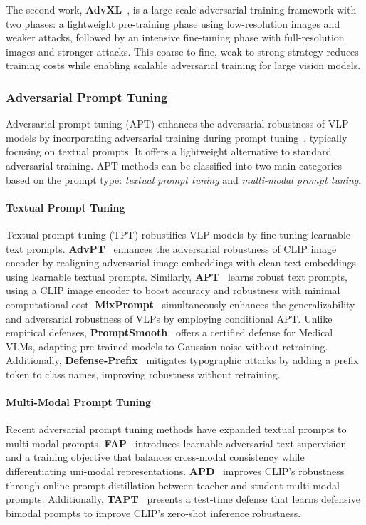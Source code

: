 The second work, \textbf{AdvXL}~\cite{wang2024revisiting}, is a large-scale adversarial training framework with two phases: a lightweight pre-training phase using low-resolution images and weaker attacks, followed by an intensive fine-tuning phase with full-resolution images and stronger attacks. This coarse-to-fine, weak-to-strong strategy reduces training costs while enabling scalable adversarial training for large vision models.


\subsubsection{Adversarial Prompt Tuning}
Adversarial prompt tuning (APT) enhances the adversarial robustness of VLP models by incorporating adversarial training during prompt tuning~\cite{zhou2022conditional, zhou2022learning, khattak2023maple}, typically focusing on textual prompts. It offers a lightweight alternative to standard adversarial training. APT methods can be classified into two main categories based on the prompt type: \emph{textual prompt tuning} and \emph{multi-modal prompt tuning}.

\paragraph{Textual Prompt Tuning}
Textual prompt tuning (TPT) robustifies VLP models by fine-tuning learnable text prompts. \textbf{AdvPT}~\cite{zhang2023adversarial} enhances the adversarial robustness of CLIP image encoder by realigning adversarial image embeddings with clean text embeddings using learnable textual prompts. Similarly, \textbf{APT}~\cite{li2024one} learns robust text prompts, using a CLIP image encoder to boost accuracy and robustness with minimal computational cost. \textbf{MixPrompt}~\cite{fan2024mixprompt} simultaneously enhances the generalizability and adversarial robustness of VLPs by employing conditional APT. Unlike empirical defenses, \textbf{PromptSmooth}~\cite{hussein2024promptsmooth} offers a certified defense for Medical VLMs, adapting pre-trained models to Gaussian noise without retraining. Additionally, \textbf{Defense-Prefix}~\cite{azuma2023defense} mitigates typographic attacks by adding a prefix token to class names, improving robustness without retraining.


\paragraph{Multi-Modal Prompt Tuning}
Recent adversarial prompt tuning methods have expanded textual prompts to multi-modal prompts. \textbf{FAP}~\cite{zhou2024few} introduces learnable adversarial text supervision and a training objective that balances cross-modal consistency while differentiating uni-modal representations. \textbf{APD}~\cite{luo2024apd} improves CLIP’s robustness through online prompt distillation between teacher and student multi-modal prompts. Additionally, \textbf{TAPT}~\cite{wang2024tapt} presents a test-time defense that learns defensive bimodal prompts to improve CLIP's zero-shot inference robustness.


